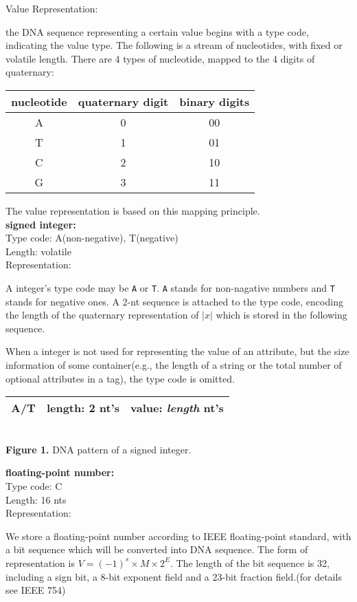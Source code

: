 \documentclass{article}
\begin{document}
\noindent
{\large Value Representation:}
\par the DNA sequence representing a certain value begins with a type code, indicating the value type. The following is a stream of nucleotides, with fixed or volatile length. There are 4 types of nucleotide, mapped to the 4 digits of quaternary:
\begin{center}
    \begin{tabular}{c|c|c}
        nucleotide & quaternary digit & binary digits \\
        \hline
        A & 0 & 00 \\
        T & 1 & 01 \\
        C & 2 & 10 \\
        G & 3 & 11 \\
    \end{tabular}
\end{center}
The value representation is based on this mapping principle.\\[6pt]
\textbf{signed integer:}\\
Type code: A(non-negative), T(negative)\\
Length: volatile\\
Representation: 
\par A integer's type code may be \texttt{A} or \texttt{T}. \texttt{A} stands for non-nagative numbers and \texttt{T} stands for negative ones. A 2-nt sequence is attached to the type code, encoding the length of the quaternary representation of $|x|$ which is stored in the following sequence.
\par When a integer is not used for representing the value of an attribute, but the size information of some container(e.g., the length of a string or the total number of optional attributes in a tag), the type code is omitted.
\begin{center}
    \begin{tabular}{|c|c|c|}
        \hline
        A/T & length: 2 nt's & value: \textit{length} nt's \\
        \hline
    \end{tabular}
    \\[3pt]{\small \textbf{Figure 1.} DNA pattern of a signed integer.}
\end{center}
\textbf{floating-point number:}\\
Type code: C\\
Length: 16 nts\\
Representation: 
\par We store a floating-point number according to IEEE floating-point standard, with a bit sequence which will be converted into DNA sequence. The form of representation is $V=(-1)^s \times M \times 2^E$. The length of the bit sequence is 32, including a sign bit, a 8-bit exponent field and a 23-bit fraction field.(for details see IEEE 754)
\end{document}
